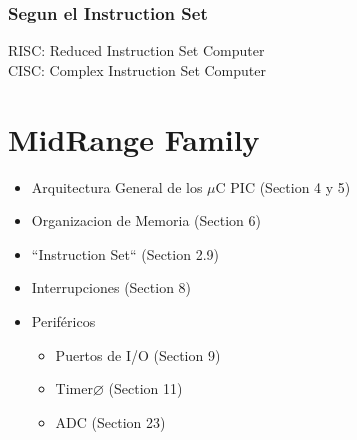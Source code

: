 \documentclass{report}
\begin{document}
\subsection{Segun el Instruction Set}
{\large RISC}: Reduced Instruction Set Computer \\

{\large CISC}: Complex Instruction Set Computer


\chapter{MidRange Family}

\begin{itemize}
	\item Arquitectura General de los \(\mu\)C PIC (Section 4 y 5)
	\item Organizacion de Memoria (Section 6)
	\item ``Instruction Set`` (Section 2.9)
	\item Interrupciones (Section 8)
	\item Periféricos \begin{itemize}
		      \item Puertos de I/O (Section 9)
		      \item Timer\(\varnothing\) (Section 11)
		      \item ADC (Section 23)
	      \end{itemize}
\end{itemize}
\end{document}
